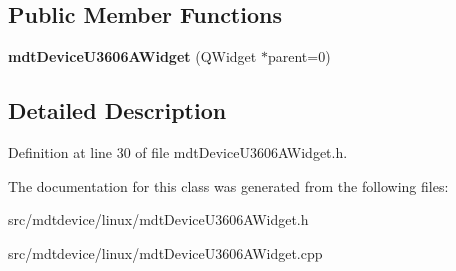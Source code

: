 \subsection*{Public Member Functions}
\begin{DoxyCompactItemize}
\item 
\hypertarget{classmdt_device_u3606_a_widget_a653d85749d67555d8c3a43a779b6d2a2}{
{\bfseries mdtDeviceU3606AWidget} (QWidget $\ast$parent=0)}
\label{classmdt_device_u3606_a_widget_a653d85749d67555d8c3a43a779b6d2a2}

\end{DoxyCompactItemize}


\subsection{Detailed Description}


Definition at line 30 of file mdtDeviceU3606AWidget.h.



The documentation for this class was generated from the following files:\begin{DoxyCompactItemize}
\item 
src/mdtdevice/linux/mdtDeviceU3606AWidget.h\item 
src/mdtdevice/linux/mdtDeviceU3606AWidget.cpp\end{DoxyCompactItemize}
